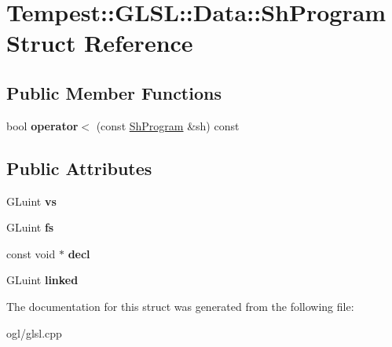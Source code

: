 \hypertarget{struct_g_l_s_l_1_1_data_1_1_sh_program}{\section{Tempest\+:\+:G\+L\+S\+L\+:\+:Data\+:\+:Sh\+Program Struct Reference}
\label{struct_g_l_s_l_1_1_data_1_1_sh_program}
}
\subsection*{Public Member Functions}
\begin{DoxyCompactItemize}
\item 
\hypertarget{struct_g_l_s_l_1_1_data_1_1_sh_program_afa995702536c571916389aa00e8ca76a}{bool {\bfseries operator$<$} (const \hyperlink{struct_g_l_s_l_1_1_data_1_1_sh_program}{Sh\+Program} \&sh) const }\label{struct_g_l_s_l_1_1_data_1_1_sh_program_afa995702536c571916389aa00e8ca76a}

\end{DoxyCompactItemize}
\subsection*{Public Attributes}
\begin{DoxyCompactItemize}
\item 
\hypertarget{struct_g_l_s_l_1_1_data_1_1_sh_program_a72fb31e38d5c65d69646cdb8d3c5d27d}{G\+Luint {\bfseries vs}}\label{struct_g_l_s_l_1_1_data_1_1_sh_program_a72fb31e38d5c65d69646cdb8d3c5d27d}

\item 
\hypertarget{struct_g_l_s_l_1_1_data_1_1_sh_program_acd764157194423d38fa4b997f10079cb}{G\+Luint {\bfseries fs}}\label{struct_g_l_s_l_1_1_data_1_1_sh_program_acd764157194423d38fa4b997f10079cb}

\item 
\hypertarget{struct_g_l_s_l_1_1_data_1_1_sh_program_adf7fb1760b61779494c0c319898e1834}{const void $\ast$ {\bfseries decl}}\label{struct_g_l_s_l_1_1_data_1_1_sh_program_adf7fb1760b61779494c0c319898e1834}

\item 
\hypertarget{struct_g_l_s_l_1_1_data_1_1_sh_program_a04ed48ea8630465cc6b07f6a7099c658}{G\+Luint {\bfseries linked}}\label{struct_g_l_s_l_1_1_data_1_1_sh_program_a04ed48ea8630465cc6b07f6a7099c658}

\end{DoxyCompactItemize}


The documentation for this struct was generated from the following file\+:\begin{DoxyCompactItemize}
\item 
ogl/glsl.\+cpp\end{DoxyCompactItemize}

